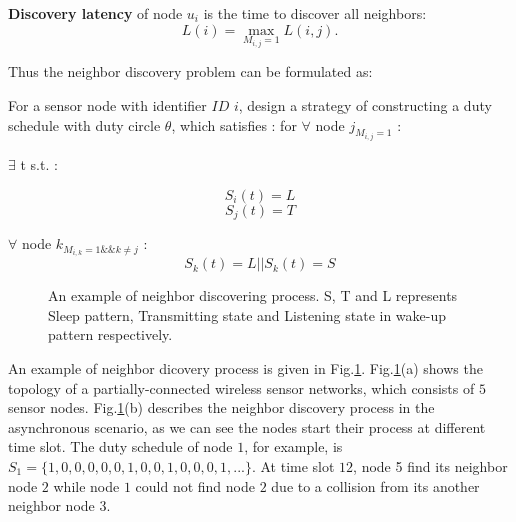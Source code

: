 \begin{definition}
\textbf{Discovery latency} of node $u_i$ is the time to discover all neighbors:
$$L(i) = \max_{M_{i,j}= 1} L (i,j).
$$
\end{definition}

Thus the neighbor discovery problem can be formulated as:
\begin{problem}
For a sensor node with identifier $ID$  $i$, design a strategy of constructing a duty schedule with duty circle $\theta$, which satisfies : 
for $\forall$ node $j_{M_{i,j}=1}$ :

$\exists$ t s.t. : 

\begin{equation*}
S_i(t) = L 
\end{equation*}
\begin{equation*} 
S_j(t) = T
\end{equation*}  

$\forall$ node $k_{M_{i,k}=1 \&\& k \neq j}$  : 
\begin{equation*}
S_k(t)= L || S_k(t)=S
\end{equation*}

\end{problem}

\begin{figure}[!t]
\centering
{}
\vspace{0.03in}
\caption{An example of neighbor discovering process. S, T and L represents Sleep pattern, 
Transmitting state and Listening state in wake-up pattern respectively.}
\label{NDexample}
\end{figure}

An example of neighbor dicovery process is given in Fig.\ref{NDexample}. 
Fig.\ref{NDexample}(a) shows the topology of a partially-connected 
wireless sensor networks, which consists of $5$ sensor nodes. 
Fig.\ref{NDexample}(b) describes the neighbor discovery process 
in the asynchronous scenario, as we can see the nodes 
start their process at different time slot. The duty schedule of 
node $1$, for example, is $S_1 = \{ 1, 0, 0, 0, 0, 0, 1, 0, 0, 1, 0, 0, 0, 1, ... \}$.  
At time slot $12$, node 5 find its neighbor node $2$ while node $1$ 
could not find node $2$ due to a collision from its another neighbor node $3$. 




